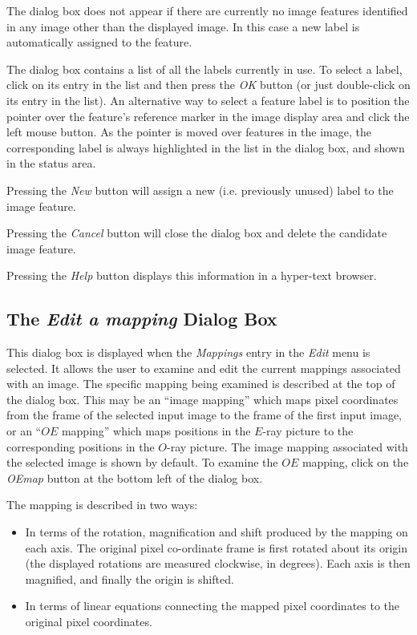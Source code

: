 \documentclass[11pt]{article}
\newcommand{\htmlref}[2]{#1}
\newcommand{\xlabel}[1]{}
\newcommand{\mylabel}[1] {\xlabel{#1}\label{#1}}
\begin{document}
The dialog box does not appear if there are currently no image features
identified in any image other than the displayed image. In this case a
new label is automatically assigned to the feature.

The dialog box contains a list of all the labels currently in use. To
select a label, click on its entry in the list and then press the {\em
OK} button (or just double-click on its entry in the list). An
alternative way to select a feature label is to position the pointer over
the feature's reference marker in the \htmlref{image display
area}{POLKA_IMAGE_DISPLAY} and click the left mouse button. As the
pointer is moved over features in the image, the corresponding label
is always highlighted in the list in the dialog box, and shown in the
\htmlref{status area}{POLKA_STATUS_AREA}.

Pressing the \emph{New} button will assign a new (i.e. previously unused)
label to the image feature.

Pressing the \emph{Cancel} button will close the dialog box and delete the
candidate image feature.

Pressing the \emph{Help} button displays this information in a hyper-text
browser.

\subsection {\mylabel{POLKA_EDIT_MAPPING_DIALOG}The \emph{Edit a mapping}
Dialog Box}
This dialog box is displayed when the \htmlref{\emph{Mappings}}
{POLKA_EDIT_MAPPINGS} entry in the \htmlref{\emph{Edit}}{POLKA_EDIT_MENU}
menu is selected. It allows the user to examine and edit the current
mappings associated with an image. The specific mapping being examined is
described at the top of the dialog box. This may be an ``image mapping''
which maps pixel coordinates from the frame of the selected input image
to the frame of the first input image, or an ``$OE$ mapping'' which maps
positions in the $E$-ray picture to the corresponding positions in the
$O$-ray picture. The image mapping associated with the selected image is
shown by default. To examine the $OE$ mapping, click on the \emph{OEmap}
button at the bottom left of the dialog box.

The mapping is described in two ways:

\begin{itemize}
\item In terms of the rotation, magnification and shift produced
by the mapping on each axis. The original pixel co-ordinate frame
is first rotated about its origin (the displayed rotations are measured
clockwise, in degrees). Each axis is then magnified, and finally the
origin is shifted.

\item In terms of linear equations connecting the mapped pixel
coordinates to the original pixel coordinates.
\end{itemize}
\end{document}
